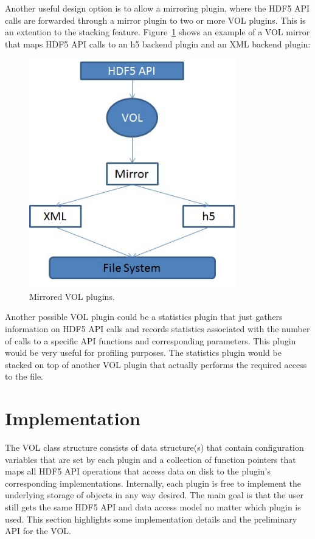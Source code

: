 \documentclass[letterpaper,hyper]{THG_RFC}
\begin{document}
Another useful design option is to allow a mirroring plugin, where the HDF5 API calls are forwarded through a mirror plugin to two or more VOL plugins. This is an extention to the stacking feature. Figure~\ref{fig:mirror} shows an example of a VOL mirror that maps HDF5 API calls to an h5 backend plugin and an XML backend plugin:

\begin{figure}[h!]
\centering
\includegraphics[width=90mm]{mirrored.jpg}
\caption{Mirrored VOL plugins.}
\label{fig:mirror}
\end{figure}

Another possible VOL plugin could be a statistics plugin that just gathers information on HDF5 API calls and records statistics associated with the number of calls to a specific API functions and corresponding parameters. This plugin would be very useful for profiling purposes. The statistics plugin would be stacked on top of another VOL plugin that actually performs the required access to the file.
\clearpage
\section{Implementation}
The VOL class structure consists of data structure(s) that contain configuration variables that are set by each plugin and a collection of function pointers that maps all HDF5 API operations that access data on disk to the plugin’s corresponding implementations. Internally, each plugin is free to implement the underlying storage of objects in any way desired. The main goal is that the user still gets the same HDF5 API and data access model no matter which plugin is used. This section highlights some implementation details and the preliminary API for the VOL.  
\end{document}
